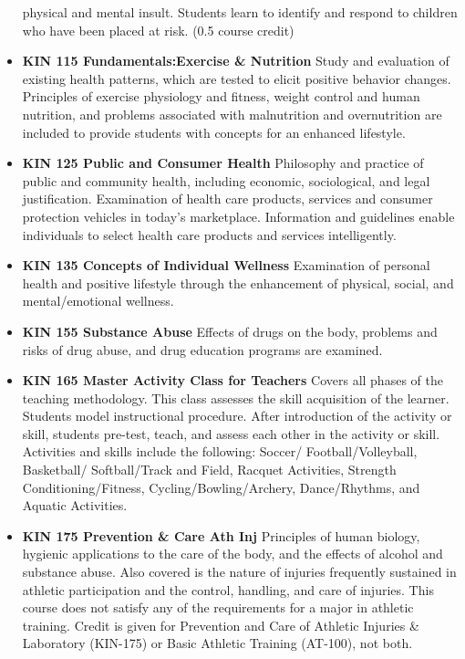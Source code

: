 \documentclass[
  letterpaper,
]{scrbook}
\begin{document}
\begin{itemize}
  physical and mental insult. Students learn to identify and respond to
  children who have been placed at risk. (0.5 course credit)
\item
  \textbf{KIN 115 Fundamentals:Exercise \& Nutrition} Study and
  evaluation of existing health patterns, which are tested to elicit
  positive behavior changes. Principles of exercise physiology and
  fitness, weight control and human nutrition, and problems associated
  with malnutrition and overnutrition are included to provide students
  with concepts for an enhanced lifestyle.
\item
  \textbf{KIN 125 Public and Consumer Health} Philosophy and practice of
  public and community health, including economic, sociological, and
  legal justification. Examination of health care products, services and
  consumer protection vehicles in today's marketplace. Information and
  guidelines enable individuals to select health care products and
  services intelligently.
\item
  \textbf{KIN 135 Concepts of Individual Wellness} Examination of
  personal health and positive lifestyle through the enhancement of
  physical, social, and mental/emotional wellness.
\item
  \textbf{KIN 155 Substance Abuse} Effects of drugs on the body,
  problems and risks of drug abuse, and drug education programs are
  examined.
\item
  \textbf{KIN 165 Master Activity Class for Teachers} Covers all phases
  of the teaching methodology. This class assesses the skill acquisition
  of the learner. Students model instructional procedure. After
  introduction of the activity or skill, students pre-test, teach, and
  assess each other in the activity or skill. Activities and skills
  include the following: Soccer/ Football/Volleyball, Basketball/
  Softball/Track and Field, Racquet Activities, Strength
  Conditioning/Fitness, Cycling/Bowling/Archery, Dance/Rhythms, and
  Aquatic Activities.
\item
  \textbf{KIN 175 Prevention \& Care Ath Inj} Principles of human
  biology, hygienic applications to the care of the body, and the
  effects of alcohol and substance abuse. Also covered is the nature of
  injuries frequently sustained in athletic participation and the
  control, handling, and care of injuries. This course does not satisfy
  any of the requirements for a major in athletic training. Credit is
  given for Prevention and Care of Athletic Injuries \& Laboratory
  (KIN-175) or Basic Athletic Training (AT-100), not both.

\end{itemize}
\end{document}
